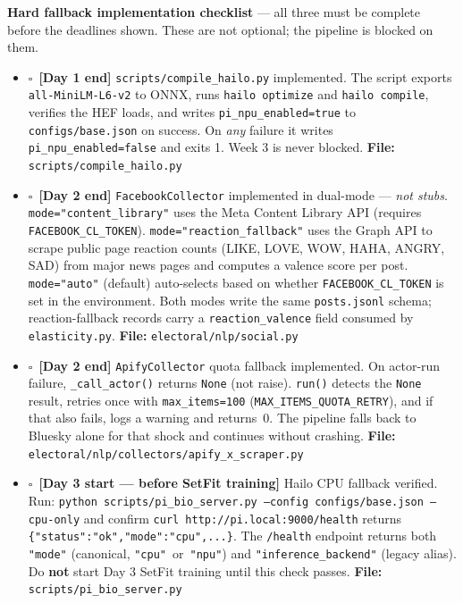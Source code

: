\documentclass[11pt]{article}
\newcommand{\done}{\textcolor{sectionblue}{$\square$}\ }
\begin{document}
\begin{taskbox}
\textbf{Hard fallback implementation checklist} --- all three must be complete before
the deadlines shown. These are not optional; the pipeline is blocked on them.

\begin{itemize}[leftmargin=1.6em, itemsep=4pt]
  \item \done \textbf{[Day 1 end]} \texttt{scripts/compile\_hailo.py}
        implemented. The script exports \texttt{all-MiniLM-L6-v2} to ONNX,
        runs \texttt{hailo optimize} and \texttt{hailo compile}, verifies the
        HEF loads, and writes \texttt{pi\_npu\_enabled=true} to
        \texttt{configs/base.json} on success. On \emph{any} failure it writes
        \texttt{pi\_npu\_enabled=false} and exits 1. Week 3 is never blocked.
        \textbf{File:} \texttt{scripts/compile\_hailo.py}

  \item \done \textbf{[Day 2 end]} \texttt{FacebookCollector} implemented in
        dual-mode --- \emph{not stubs}. \texttt{mode="content\_library"} uses
        the Meta Content Library API (requires \texttt{FACEBOOK\_CL\_TOKEN}).
        \texttt{mode="reaction\_fallback"} uses the Graph API to scrape public
        page reaction counts (LIKE, LOVE, WOW, HAHA, ANGRY, SAD) from major
        news pages and computes a valence score per post.
        \texttt{mode="auto"} (default) auto-selects based on whether
        \texttt{FACEBOOK\_CL\_TOKEN} is set in the environment.
        Both modes write the same \texttt{posts.jsonl} schema;
        reaction-fallback records carry a \texttt{reaction\_valence} field
        consumed by \texttt{elasticity.py}.
        \textbf{File:} \texttt{electoral/nlp/social.py}

  \item \done \textbf{[Day 2 end]} \texttt{ApifyCollector} quota fallback
        implemented. On actor-run failure, \texttt{\_call\_actor()} returns
        \texttt{None} (not raise). \texttt{run()} detects the \texttt{None}
        result, retries once with \texttt{max\_items=100}
        (\texttt{MAX\_ITEMS\_QUOTA\_RETRY}), and if that also fails, logs a
        warning and returns~0. The pipeline falls back to Bluesky alone for
        that shock and continues without crashing.
        \textbf{File:} \texttt{electoral/nlp/collectors/apify\_x\_scraper.py}

  \item \done \textbf{[Day 3 start — before SetFit training]} Hailo CPU
        fallback verified. Run:
        \texttt{python scripts/pi\_bio\_server.py --config configs/base.json
        --cpu-only} and confirm \texttt{curl http://pi.local:9000/health}
        returns \texttt{\{"status":"ok","mode":"cpu",...\}}. The
        \texttt{/health} endpoint returns both \texttt{"mode"} (canonical,
        \texttt{"cpu"}~or~\texttt{"npu"}) and \texttt{"inference\_backend"}
        (legacy alias). Do \textbf{not} start Day 3 SetFit training until
        this check passes.
        \textbf{File:} \texttt{scripts/pi\_bio\_server.py}
\end{itemize}
\end{taskbox}
\end{document}
